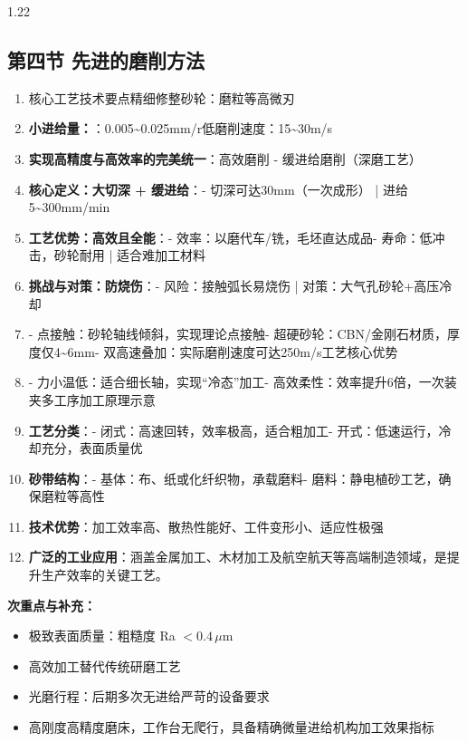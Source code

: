 \documentclass[12pt,a4paper]{article}
\begin{document}
\begin{spacing}{1.22}
\subsection{第四节 先进的磨削方法}
\begin{tcolorbox}[colback=yellow!6,colframe=red!55!black,title=重点,left=1mm,right=1mm]
\begin{enumerate}[leftmargin=2.2em,label=\arabic*.]
  \item 核心工艺技术要点精细修整砂轮：磨粒等高微刃
  \item \textbf{小进给量：}：0.005\textasciitilde{}0.025mm/r低磨削速度：15\textasciitilde{}30m/s
  \item \textbf{实现高精度与高效率的完美统一}：高效磨削 - 缓进给磨削（深磨工艺）
  \item \textbf{核心定义：大切深 + 缓进给}：- 切深可达30mm（一次成形） | 进给5\textasciitilde{}300mm/min
  \item \textbf{工艺优势：高效且全能}：- 效率：以磨代车/铣，毛坯直达成品- 寿命：低冲击，砂轮耐用 | 适合难加工材料
  \item \textbf{挑战与对策：防烧伤}：- 风险：接触弧长易烧伤 | 对策：大气孔砂轮+高压冷却
  \item - 点接触：砂轮轴线倾斜，实现理论点接触- 超硬砂轮：CBN/金刚石材质，厚度仅4\textasciitilde{}6mm- 双高速叠加：实际磨削速度可达250m/s工艺核心优势
  \item - 力小温低：适合细长轴，实现“冷态”加工- 高效柔性：效率提升6倍，一次装夹多工序加工原理示意
  \item \textbf{工艺分类}：- 闭式：高速回转，效率极高，适合粗加工- 开式：低速运行，冷却充分，表面质量优
  \item \textbf{砂带结构}：- 基体：布、纸或化纤织物，承载磨料- 磨料：静电植砂工艺，确保磨粒等高性
  \item \textbf{技术优势}：加工效率高、散热性能好、工件变形小、适应性极强
  \item \textbf{广泛的工业应用}：涵盖金属加工、木材加工及航空航天等高端制造领域，是提升生产效率的关键工艺。
\end{enumerate}
\end{tcolorbox}
\noindent\textbf{次重点与补充：}
\begin{itemize}[leftmargin=2.2em,label=--]
  \item 极致表面质量：粗糙度 Ra $<0.4\,\mu\text{m}$
  \item 高效加工替代传统研磨工艺
  \item 光磨行程：后期多次无进给严苛的设备要求
  \item 高刚度高精度磨床，工作台无爬行，具备精确微量进给机构加工效果指标

\end{itemize}
\end{spacing}
\end{document}
